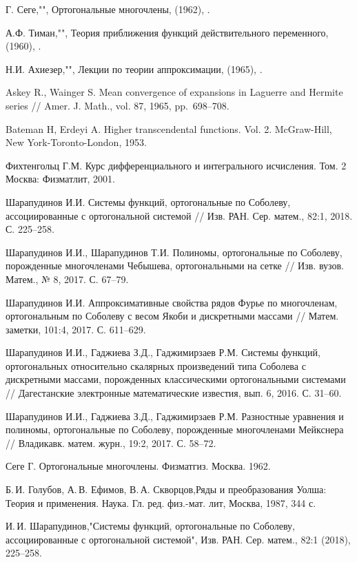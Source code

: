 \begin{thebibliography}{20}
Г. Сеге,"", Ортогональные многочлены,  (1962), .

А.Ф. Тиман,"", Теория приближения функций действительного переменного,  (1960), .

Н.И. Ахиезер,"", Лекции по теории аппроксимации,  (1965), .

 {Askey R., Wainger S.} Mean convergence of expansions in Laguerre and Hermite series // Amer. J. Math., vol. 87, 1965, pp.~698--708.

 {Bateman H, Erdeyi A.} Higher transcendental functions. Vol. 2. McGraw-Hill, New York-Toronto-London, 1953.

 {Фихтенгольц Г.М.} Курс дифференциального и интегрального исчисления. Том. 2 Москва: Физматлит, 2001.

 {Шарапудинов И.И.} Системы функций, ортогональные по Соболеву, ассоциированные с ортогональной системой // Изв. РАН. Сер. матем., 82:1, 2018. С. 225--258.

 {Шарапудинов И.И., Шарапудинов Т.И.} Полиномы, ортогональные по Соболеву, порожденные многочленами Чебышева, ортогональными на сетке // Изв. вузов. Матем., № 8, 2017. С. 67--79.

 {Шарапудинов И.И.} Аппроксимативные свойства рядов Фурье по многочленам, ортогональным по Соболеву с весом Якоби и дискретными массами // Матем. заметки, 101:4, 2017. С. 611--629.

 {Шарапудинов И.И., Гаджиева З.Д., Гаджимирзаев Р.М.} Системы функций, ортогональных относительно скалярных произведений типа Соболева с дискретными массами, порожденных классическими ортогональными системами // Дагестанские электронные математические известия, вып. 6, 2016. С. 31--60. 

 {Шарапудинов И.И., Гаджиева З.Д., Гаджимирзаев Р.М.} Разностные уравнения и полиномы, ортогональные по Соболеву, порожденные многочленами Мейкснера // Владикавк. матем. журн., 19:2, 2017. С. 58--72.

 {Сеге Г.} Ортогональные многочлены. Физматгиз. Москва. 1962.

Б.\,И. Голубов, А.\,В. Ефимов, В.\,А. Скворцов,Ряды и преобразования Уолша: Теория и применения. Наука. Гл. ред. физ.-мат. лит, Москва, 1987, 344 с.

И.\,И. Шарапудинов,"Системы функций, ортогональные по Соболеву, ассоциированные с ортогональной системой", Изв. РАН. Сер. матем., 82:1 (2018), 225--258.


\end{thebibliography}
